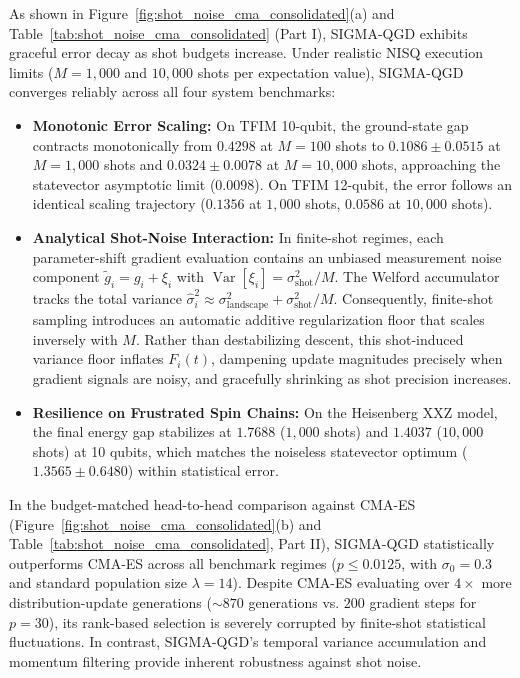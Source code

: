 \documentclass[11pt,a4paper]{article}
\begin{document}
As shown in Figure~\ref{fig:shot_noise_cma_consolidated}(a) and Table~\ref{tab:shot_noise_cma_consolidated} (Part I), SIGMA-QGD exhibits graceful error decay as shot budgets increase. Under realistic NISQ execution limits ($M=1{,}000$ and $10{,}000$ shots per expectation value), SIGMA-QGD converges reliably across all four system benchmarks:
\begin{itemize}
    \item \textbf{Monotonic Error Scaling:} On TFIM 10-qubit, the ground-state gap contracts monotonically from $0.4298$ at $M=100$ shots to $0.1086 \pm 0.0515$ at $M=1{,}000$ shots and $0.0324 \pm 0.0078$ at $M=10{,}000$ shots, approaching the statevector asymptotic limit ($0.0098$). On TFIM 12-qubit, the error follows an identical scaling trajectory ($0.1356$ at $1{,}000$ shots, $0.0586$ at $10{,}000$ shots).
    \item \textbf{Analytical Shot-Noise Interaction:} In finite-shot regimes, each parameter-shift gradient evaluation contains an unbiased measurement noise component $\tilde{g}_i = g_i + \xi_i$ with $\operatorname{Var}[\xi_i] = \sigma_{\text{shot}}^2 / M$. The Welford accumulator tracks the total variance $\hat{\sigma}_i^2 \approx \sigma_{\text{landscape}}^2 + \sigma_{\text{shot}}^2 / M$. Consequently, finite-shot sampling introduces an automatic additive regularization floor that scales inversely with $M$. Rather than destabilizing descent, this shot-induced variance floor inflates $F_i(t)$, dampening update magnitudes precisely when gradient signals are noisy, and gracefully shrinking as shot precision increases.
    \item \textbf{Resilience on Frustrated Spin Chains:} On the Heisenberg XXZ model, the final energy gap stabilizes at $1.7688$ ($1{,}000$ shots) and $1.4037$ ($10{,}000$ shots) at 10 qubits, which matches the noiseless statevector optimum ($1.3565 \pm 0.6480$) within statistical error.
\end{itemize}

In the budget-matched head-to-head comparison against CMA-ES (Figure~\ref{fig:shot_noise_cma_consolidated}(b) and Table~\ref{tab:shot_noise_cma_consolidated}, Part II), SIGMA-QGD statistically outperforms CMA-ES across all benchmark regimes ($p \le 0.0125$, with $\sigma_0 = 0.3$ and standard population size $\lambda = 14$). Despite CMA-ES evaluating over $4\times$ more distribution-update generations ($\sim 870$ generations vs. $200$ gradient steps for $p=30$), its rank-based selection is severely corrupted by finite-shot statistical fluctuations. In contrast, SIGMA-QGD's temporal variance accumulation and momentum filtering provide inherent robustness against shot noise.
\end{document}

